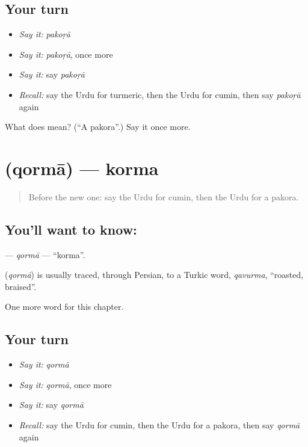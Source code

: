 \subsection*{Your turn}
\begin{itemize}
\raggedright
  \item \emph{Say it:} \emph{pakoṛā}
  \item \emph{Say it:} \emph{pakoṛā}, once more
  \item \emph{Say it:} say \emph{pakoṛā}
  \item \emph{Recall:} say the Urdu for turmeric, then the Urdu for cumin, then say \emph{pakoṛā} again
\end{itemize}

\begin{tcolorbox}[breakable,colback=teal!4,colframe=teal!35!black,title={Before you move on}]
What does  mean? (\textquotedblleft{}A pakora\textquotedblright{}.) Say it once more.
\end{tcolorbox}
\section[\texorpdfstring{\ur{قورمہ} (qormā)}{قورمہ (qormā)}]{ (qormā) — korma}

\label{lesson:UR-C200-qorma}



\begin{quote}
Before the new one: say the Urdu for cumin, then the Urdu for a pakora.
\end{quote}

\subsection*{You'll want to know: }
\textbf{} — \emph{qormā} — \textquotedblleft{}korma\textquotedblright{}.

\begin{cousinweb}
\textbf{} (\emph{qormā}) is usually traced, through Persian, to a Turkic word, \emph{qavurma}, \textquotedblleft{}roasted, braised\textquotedblright{}.
\end{cousinweb}

\begin{grammarlens}[title={What you've built}]
One more word for this chapter.
\end{grammarlens}

\subsection*{Your turn}
\begin{itemize}
\raggedright
  \item \emph{Say it:} \emph{qormā}
  \item \emph{Say it:} \emph{qormā}, once more
  \item \emph{Say it:} say \emph{qormā}
  \item \emph{Recall:} say the Urdu for cumin, then the Urdu for a pakora, then say \emph{qormā} again
\end{itemize}


